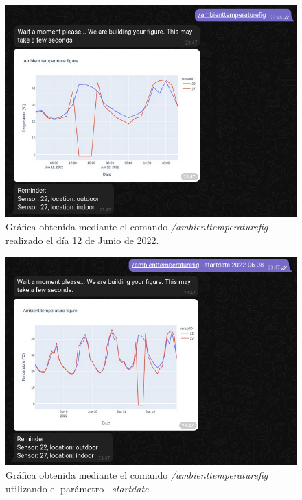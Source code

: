 \documentclass[a4paper, 12pt, oneside]{book}
\begin{document}
\begin{figure}[H]
	\centering
    \includegraphics[width=12cm, keepaspectratio]{img/ambienttemperaturefig}
    \caption{Gráfica obtenida mediante el comando \textit{/ambienttemperaturefig} realizado el día 12 de Junio de 2022.}
    \label{figura:ambienttemperaturefig}
\end{figure}

\begin{figure}[H]
	\centering
    \includegraphics[width=12cm, keepaspectratio]{img/ambienttemperaturefig_startdate}
    \caption{Gráfica obtenida mediante el comando \textit{/ambienttemperaturefig} utilizando el parámetro \textit{--startdate}.}
    \label{figura:ambienttemperaturefig_startdate}
\end{figure}
\end{document}
